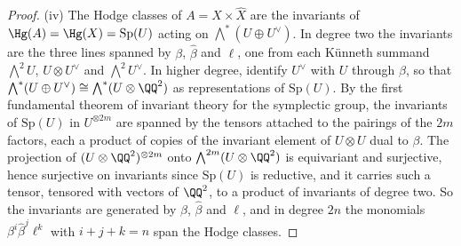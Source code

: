 \begin{proof}
(iv) The Hodge classes of $A=X\times\widehat{X}$ are the invariants of
$\Hg(A)=\Hg(X)=\mathrm{Sp}(U)$ acting on
$\bigwedge^{*}(U\oplus U^{\vee})$. In degree two the invariants are the three
lines spanned by $\beta$, $\widehat{\beta}$ and $\ell$, one from each
K\"unneth summand $\bigwedge^{2}U$, $U\otimes U^{\vee}$ and
$\bigwedge^{2}U^{\vee}$. In higher degree, identify $U^{\vee}$ with $U$
through $\beta$, so that $\bigwedge^{*}(U\oplus U^{\vee})\cong
\bigwedge^{*}(U\otimes\QQ^{2})$ as representations of $\mathrm{Sp}(U)$. By the
first fundamental theorem of invariant theory for the symplectic group, the
invariants of $\mathrm{Sp}(U)$ in $U^{\otimes2m}$ are spanned by the tensors
attached to the pairings of the $2m$ factors, each a product of copies of the
invariant element of $U\otimes U$ dual to $\beta$. The projection of
$(U\otimes\QQ^{2})^{\otimes2m}$ onto $\bigwedge^{2m}(U\otimes\QQ^{2})$ is
equivariant and surjective, hence surjective on invariants since
$\mathrm{Sp}(U)$ is reductive, and it carries such a tensor, tensored with
vectors of $\QQ^{2}$, to a product of invariants of degree two. So the
invariants are generated by $\beta$, $\widehat{\beta}$ and $\ell$, and in
degree $2n$ the monomials $\beta^{i}\widehat{\beta}^{j}\ell^{k}$ with
$i+j+k=n$ span the Hodge classes.
\end{proof}

